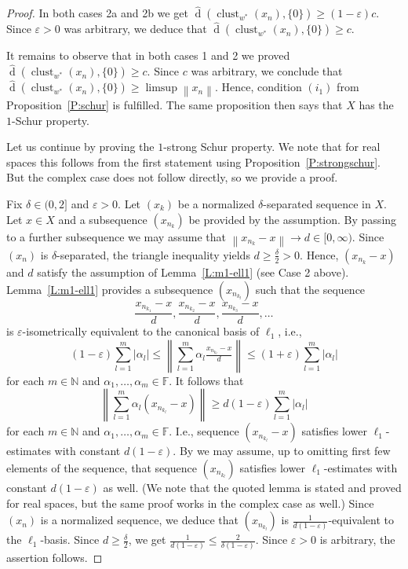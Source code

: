 \documentclass{amsart}
\numberwithin{equation}{section}
\theoremstyle{definition}
\def\ep{\varepsilon}
\def\en{\mathbb N}
\def\ef{\mathbb F}
\def\dh{\widehat{\operatorname{d}}}
\def\clu#1{\operatorname{clust}_{w^*}(#1)}
\newcommand{\norm}[1]{\left\|#1\right\|}
\newcommand{\abs}[1]{\left|#1\right|}
\begin{document}
\begin{proof}
    In both cases 2a and 2b we get $\dh(\clu{x_n},\{0\})\ge(1-\ep)c$. Since $\ep>0$ was arbitrary, we deduce that 
    $\dh(\clu{x_n},\{0\})\ge c$.

    \smallskip

It remains to observe that in both cases 1 and 2 we proved $\dh(\clu{x_n},\{0\})\ge c$. Since $c$ was arbitrary, we conclude that $\dh(\clu{x_n},\{0\})\ge\limsup\norm{x_n}$. Hence, condition $(i_1)$ from Proposition~\ref{P:schur} is fulfilled. The same proposition then says that $X$ has the $1$-Schur property. 
    \smallskip

    Let us continue by proving the $1$-strong Schur property. We note that for real spaces this follows from the first statement using Proposition~\ref{P:strongschur}. But the complex case does not follow directly, so we provide a proof.

    Fix $\delta\in(0,2]$ and $\ep>0$. Let $(x_k)$ be a normalized $\delta$-separated sequence in $X$. Let $x\in X$ and a subsequence $(x_{n_k})$ be provided by the assumption. By passing to a further subsequence we may assume that $\norm{x_{n_k}-x}\to d\in[0,\infty)$. Since $(x_n)$ is $\delta$-separated, the triangle inequality yields $d\ge\frac\delta2>0$. Hence, $(x_{n_k}-x)$ and $d$ satisfy the assumption of Lemma~\ref{L:m1-ell1} (see Case 2 above). Lemma~\ref{L:m1-ell1} provides a subsequence $(x_{n_{k_l}})$ such that the sequence
    $$\frac{x_{n_{k_1}}-x}d,\frac{x_{n_{k_2}}-x}d,\frac{x_{n_{k_3}}-x}d,\dots$$ is $\ep$-isometrically equivalent to the canonical basis of $\ell_1$, i.e.,
    $$(1-\ep)\sum_{l=1}^m\abs{\alpha_l}\le \norm{\sum_{l=1}^m\alpha_l\tfrac{x_{n_{k_l}}-x}d}\le (1+\ep)\sum_{l=1}^m\abs{\alpha_l}$$ for each $m\in\en$ and $\alpha_1,\dots,\alpha_m\in\ef$. It follows that
     $$\norm{\sum_{l=1}^m\alpha_l(x_{n_{k_l}}-x)}\ge d(1-\ep)\sum_{l=1}^m\abs{\alpha_l}$$
    for each $m\in\en$ and $\alpha_1,\dots,\alpha_m\in\ef$. I.e., sequence $(x_{n_{k_l}}-x)$ satisfies lower $\ell_1$-estimates with constant $d(1-\ep)$. By \cite[Lemma 4.2]{knaust-odell} we may assume, up to omitting first few elements of the sequence, that sequence $(x_{n_{k_l}})$ satisfies lower $\ell_1$-estimates with constant $d(1-\ep)$ as well. (We note that the quoted lemma is stated and proved for real spaces, but the same proof works in the complex case as well.)
    Since $(x_n)$ is a normalized sequence, we deduce that $(x_{n_{k_l}})$ is $\frac{1}{d(1-\ep)}$-equivalent to the $\ell_1$-basis. Since $d\ge\frac\delta2$, we get
    $\frac{1}{d(1-\ep)}\le\frac2{\delta(1-\ep)}$. Since $\ep>0$ is arbitrary, the assertion follows.  
    \end{proof}
\end{document}
